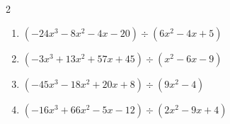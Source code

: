 \begin{multicols}{2}
\begin{enumerate}
        \phantom{$商 : -9x+8, \quad 剰余 : 6x+2$}

  \item $(-24x^{3}-8x^{2}-4x-20) \div (6x^{2}-4x+5)$

        \phantom{$商 : -4x-4, \quad 剰余 : 4x+4$}

  \item $(-3x^{3}+13x^{2}+57x+45) \div (x^{2}-6x-9)$

        \phantom{$商 : -3x-5, \quad 剰余 : x-7$}

  \item $(-45x^{3}-18x^{2}+20x+8) \div (9x^{2}-4)$

        \phantom{$商 : -5x-2, \quad 剰余 : -4x+8$}

  \item $(-16x^{3}+66x^{2}-5x-12) \div (2x^{2}-9x+4)$

        \phantom{$商 : -8x-3, \quad 剰余 : 3x+5$}

\end{enumerate}
\end{multicols}

\newpage
\resetdrill

